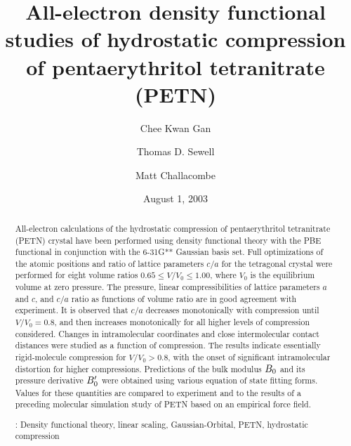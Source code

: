 \documentclass[prb,aps,nobibnotes,superbib,preprint]{revtex4}
\begin{document}
\title[Short Title]{ 
All-electron density functional studies of hydrostatic compression of 
pentaerythritol tetranitrate (PETN)}
\author{Chee Kwan Gan\footnotemark[1]}
\author{Thomas D. Sewell\footnotemark[2]}
\author{Matt Challacombe\footnotemark[3]}

\date{August 1, 2003}

\begin{abstract}
All-electron calculations of the hydrostatic compression of
pentaerythritol tetranitrate (PETN) crystal have been performed using
density functional theory with the PBE functional in conjunction with
the 6-31G** Gaussian basis set.  Full optimizations of the atomic
positions and ratio of lattice parameters $c/a$ for the tetragonal
crystal were performed for eight volume ratios $0.65
\le V/V_0 \le 1.00$, where $V_0$ is the equilibrium volume at zero
pressure.  The pressure, linear compressibilities of lattice
parameters $a$ and $c$, and $c/a$ ratio as functions of volume ratio
are in good agreement with experiment.  It is observed that
$c/a$ decreases monotonically with compression until $V/V_0=0.8$, 
and then increases monotonically for all higher levels of compression
considered.  Changes in intramolecular coordinates
and close intermolecular contact distances were studied as a function
of compression.  The results indicate essentially rigid-molecule compression
for $V/V_0 >0.8$, with the onset of significant intramolecular distortion
for higher compressions.  Predictions of the bulk modulus $B_0$ and its 
pressure derivative ${B'_0}$ were obtained using various equation of 
state fitting forms. Values for these quantities are compared to 
experiment and to the results of a preceding molecular simulation study 
of PETN based on an empirical force field.

\smallskip
{}: Density functional theory, linear scaling, 
Gaussian-Orbital, PETN, hydrostatic compression
\end{abstract}

\maketitle

\end{document}
